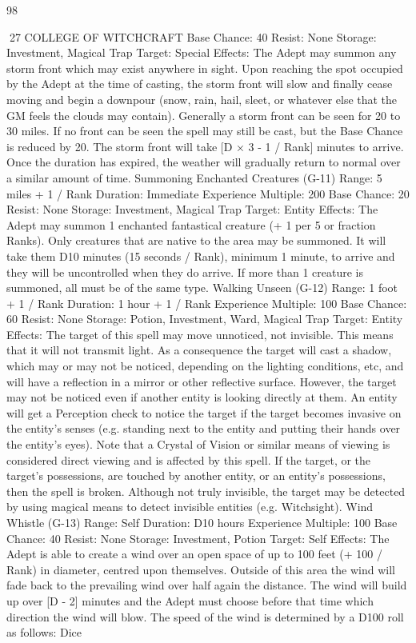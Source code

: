 \documentclass[a4paper]{article}
\begin{document}
\begin{multicols}{3}
98

27 COLLEGE OF WITCHCRAFT
Base Chance: 40%
Resist: None
Storage: Investment, Magical Trap
Target: Special
Effects: The Adept may summon any storm front
which may exist anywhere in sight. Upon reaching
the spot occupied by the Adept at the time of casting, the storm front will slow and finally cease
moving and begin a downpour (snow, rain, hail,
sleet, or whatever else that the GM feels the clouds
may contain). Generally a storm front can be seen
for 20 to 30 miles. If no front can be seen the spell
may still be cast, but the Base Chance is reduced
by 20. The storm front will take [D × 3 - 1 / Rank]
minutes to arrive. Once the duration has expired,
the weather will gradually return to normal over a
similar amount of time.
Summoning Enchanted Creatures (G-11)
Range: 5 miles + 1 / Rank
Duration: Immediate
Experience Multiple: 200
Base Chance: 20%
Resist: None
Storage: Investment, Magical Trap
Target: Entity
Effects: The Adept may summon 1 enchanted
fantastical creature (+ 1 per 5 or fraction Ranks).
Only creatures that are native to the area may be
summoned. It will take them D10 minutes (15
seconds / Rank), minimum 1 minute, to arrive and
they will be uncontrolled when they do arrive. If
more than 1 creature is summoned, all must be of
the same type.
Walking Unseen (G-12)
Range: 1 foot + 1 / Rank
Duration: 1 hour + 1 / Rank
Experience Multiple: 100
Base Chance: 60%
Resist: None
Storage: Potion, Investment, Ward, Magical Trap
Target: Entity
Effects: The target of this spell may move unnoticed, not invisible. This means that it will not
transmit light. As a consequence the target will cast
a shadow, which may or may not be noticed, depending on the lighting conditions, etc, and will
have a reflection in a mirror or other reflective
surface. However, the target may not be noticed
even if another entity is looking directly at them.
An entity will get a Perception check to notice the
target if the target becomes invasive on the entity’s
senses (e.g. standing next to the entity and putting
their hands over the entity’s eyes). Note that a
Crystal of Vision or similar means of viewing is
considered direct viewing and is affected by this
spell. If the target, or the target’s possessions, are
touched by another entity, or an entity’s possessions, then the spell is broken. Although not truly
invisible, the target may be detected by using
magical means to detect invisible entities (e.g.
Witchsight).
Wind Whistle (G-13)
Range: Self
Duration: D10 hours
Experience Multiple: 100
Base Chance: 40%
Resist: None
Storage: Investment, Potion
Target: Self
Effects: The Adept is able to create a wind over an
open space of up to 100 feet (+ 100 / Rank) in
diameter, centred upon themselves. Outside of this
area the wind will fade back to the prevailing wind
over half again the distance. The wind will build up
over [D - 2] minutes and the Adept must choose
before that time which direction the wind will
blow. The speed of the wind is determined by a
D100 roll as follows:
Dice


\end{multicols}
\end{document}
